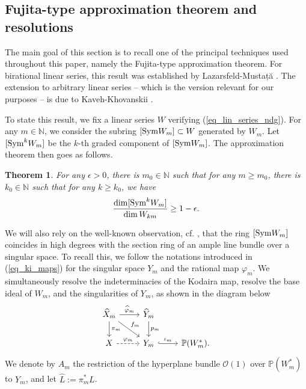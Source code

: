 \documentclass[12pt]{article}
\numberwithin{equation}{section}
\theoremstyle{theorem}
\newtheorem{thm}{Theorem}[section]
\theoremstyle{definition}
\theoremstyle{remark}
\newcommand{\sym}{{\rm{Sym}}}
\newcommand{\nat}{\mathbb{N}}
\begin{document}
	
	\subsection{Fujita-type approximation theorem and resolutions}\label{sect_fujita}
	
	The main goal of this section is to recall one of the principal techniques used throughout this paper, namely the Fujita-type approximation theorem.
	For birational linear series, this result was established by Lazarsfeld-Mustață \cite[Theorem D]{LazMus}.
	The extension to arbitrary linear series -- which is the version relevant for our purposes -- is due to Kaveh-Khovanskii \cite[Corollary 3.11]{KavehKhov}.
	\par 
	To state this result, we fix a linear series $W$ verifying (\ref{eq_lin_series_ndg}). 
	For any $m \in \nat$, we consider the subring $[\sym W_m] \subset W$ generated by $W_m$. 
	Let $[\sym^k W_m]$ be the $k$-th graded component of $[\sym W_m]$. 
	The approximation theorem then goes as follows.
	\begin{thm}\label{thm_sym_subalgebra}
		For any $\epsilon > 0$, there is $m_0 \in \nat$ such that for any $m \geq m_0$, there is $k_0 \in \nat$ such that for any $k \geq k_0$, we have
		\begin{equation}
			\frac{\dim [\sym^k W_m]}{\dim W_{km}}
			\geq 
			1 - \epsilon.
		\end{equation}
	\end{thm}
	\par 
	We will also rely on the well-known observation, cf. \cite[Lemma 3.2]{ChangJow}, that the ring $[\sym W_m]$ coincides in high degrees with the section ring of an ample line bundle over a singular space. 
	To recall this, we follow the notations introduced in (\ref{eq_ki_maps}) for the singular space $Y_m$ and the rational map $\varphi_m$.
	We simultaneously resolve the indeterminacies of the Kodaira map, resolve the base ideal of $W_m$, and the singularities of $Y_m$, as shown in the diagram below
	\begin{equation}\label{eq_blow_up_kod}
		\begin{tikzcd}
		\widehat{X}_m \arrow[d, "\pi_m"] \arrow[dr, "f_m"] \arrow[r, "\widehat{\varphi}_m"]  & \widehat{Y}_m \arrow[d, "p_m"] & \\
X \arrow[r, dashed, "\varphi_m"] & Y_m \arrow[r, hook, "\iota_m"] & \mathbb{P}(W_m^*).
		\end{tikzcd}
	\end{equation}
	We denote by $A_m$ the restriction of the hyperplane bundle $\mathscr{O}(1)$ over $\mathbb{P}(W_m^*)$ to $Y_m$, and let $\widehat{L} := \pi_m^* L$.
\end{document}
